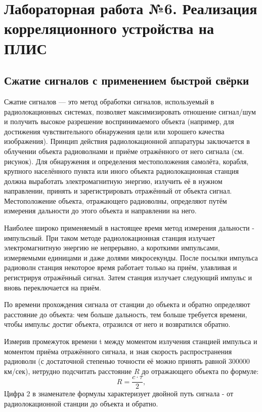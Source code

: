 \chapter{Лабораторная работа №6. Реализация корреляционного устройства на ПЛИС}

\section{Сжатие сигналов с применением быстрой свёрки}

Сжатие сигналов — это метод обработки сигналов, используемый в радиолокационных системах,
позволяет максимизировать отношение сигнал/шум и получить высокое разрешение воспринимаемого объекта (например, для достижения чувствительного обнаружения цели или хорошего качества изображения). Принцип действия радиолокационной аппаратуры заключается в облучении объекта радиоволнами и приёме отражённого от него сигнала (см. рисунок). Для обнаружения и определения местоположения самолёта, корабля, крупного населённого пункта или иного объекта радиолокационная станция должна выработать электромагнитную энергию, излучить её в нужном направлении, принять и зарегистрировать отражённый от объекта сигнал. Местоположение объекта, отражающего радиоволны, определяют путём измерения дальности до этого объекта и направлении на него.

Наиболее широко применяемый в настоящее время метод измерения дальности - импульсный. При таком методе радиолокационная станция излучает электромагнитную энергию не непрерывно, а короткими импульсами, измеряемыми единицами и даже долями микросекунды. После посылки импульса радиоволн станция некоторое время работает только на приём, улавливая и регистрируя отражённый сигнал. Затем станция излучает следующий импульс и вновь переключается на приём.

По времени прохождения сигнала от станции до объекта и обратно определяют расстояние до объекта: чем больше дальность, тем больше требуется времени, чтобы импульс достиг объекта, отразился от него и возвратился обратно.

Измерив промежуток времени t между моментом излучения станцией импульса и моментом приёма отражённого сигнала, и зная скорость распространения радиоволн (с достаточной степенью точности её можно принять равной 300000 км/сек), нетрудно подсчитать расстояние $R$ до отражающего объекта по формуле:
\begin{equation}
R = \frac{c \cdot \tau}{2},
\end{equation}
Цифра 2 в знаменателе формулы характеризует двойной путь сигнала - от радиолокационной станции до объекта и обратно.

